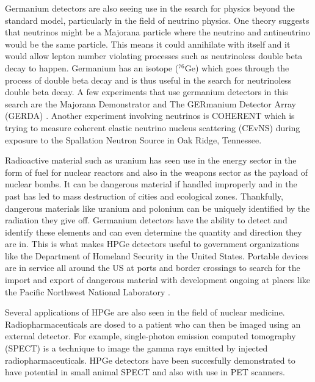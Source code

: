 Germanium detectors are also seeing use in the search for physics beyond the standard model, particularly in the field of neutrino physics.
One theory suggests that neutrinos might be a Majorana particle where the neutrino and antineutrino would be the same particle.
This means it could annihilate with itself and it would allow lepton number violating processes such as neutrinoless double beta decay to happen.
Germanium has an isotope ($^{76}$Ge) which goes through the process of double beta decay and is thus useful in the search for neutrinoless double beta decay.
A few experiments that use germanium detectors in this search are the Majorana Demonstrator \cite{majorana} and The GERmanium Detector Array (GERDA) \cite{gerda}.
Another experiment involving neutrinos is COHERENT \cite{coherent} which is trying to measure coherent elastic neutrino nucleus scattering (CEvNS) during exposure to the Spallation Neutron Source in Oak Ridge, Tennessee.

Radioactive material such as uranium has seen use in the energy sector in the form of fuel for nuclear reactors and also in the weapons sector as the payload of nuclear bombs.
It can be dangerous material if handled improperly and in the past has led to mass destruction of cities and ecological zones.
Thankfully, dangerous materials like uranium and polonium can be uniquely identified by the radiation they give off.
Germanium detectors have the ability to detect and identify these elements and can even determine the quantity and direction they are in.
This is what makes HPGe detectors useful to government organizations like the Department of Homeland Security in the United States.
Portable devices are in service all around the US at ports and border crossings to search for the import and export of dangerous material with development ongoing at places like the Pacific Northwest National Laboratory \cite{StaveHS}.

Several applications of HPGe are also seen in the field of nuclear medicine.
Radiopharmaceuticals are dosed to a patient who can then be imaged using an external detector.
For example, single-photon emission computed tomography (SPECT) is a technique to image the gamma rays emitted by injected radiopharmaceuticals.
HPGe detectors have been succesfully demonstrated to have potential in small animal SPECT \cite{SPECT} and also with use in PET scanners.

